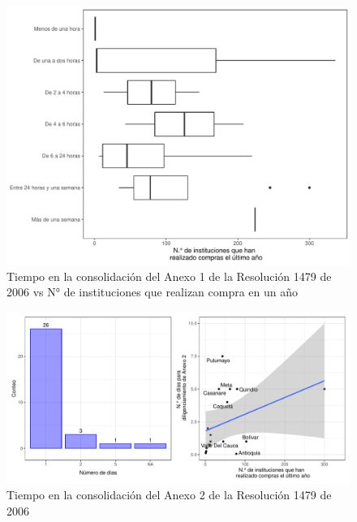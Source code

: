 \documentclass[
]{book}
\begin{document}
\begin{figure}
\includegraphics[width=0.85\linewidth]{InformeFinal_files/figure-latex/TiemposConsolidacionA1-1-1} \caption{Tiempo en la consolidación del Anexo 1 de la Resolución 1479 de 2006 vs N° de instituciones que realizan compra en un año}\label{fig:TiemposConsolidacionA1-1}
\end{figure}

\begin{figure}
\includegraphics[width=1\linewidth]{InformeFinal_files/figure-latex/TiemposConsolidacionA2-1} \caption{Tiempo en la consolidación del Anexo 2 de la Resolución 1479 de 2006}\label{fig:TiemposConsolidacionA2}
\end{figure}
\end{document}
